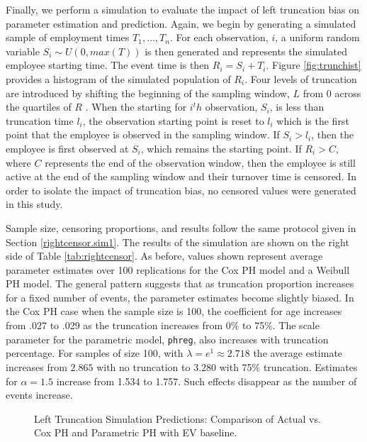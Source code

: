 \documentclass[12pt,letterpaper]{article}
\begin{document}
Finally, we perform a simulation to evaluate the impact of left truncation bias on parameter estimation and prediction. Again, we begin by generating a simulated sample of employment times $T_1, \ldots, T_n$.  For each observation, $i$, a uniform random variable $S_i \sim U(0,max(T))$ is then generated and represents the simulated employee starting time. The event time is then $R_i = S_i+T_i$. Figure \ref{fig:trunchist} provides a histogram of the simulated population of $R_i$. Four levels of truncation are introduced by shifting the beginning of the sampling window, $L$ from 0 across the quartiles of $R$ . When the starting for $i^th$ observation, $S_i$, is less than truncation time $l_i$, the observation starting point is reset to $l_i$ which is the first point that the employee is observed in the sampling window. If $S_i> l_i$, then the employee is first observed at $S_i$, which remains the starting point.  If $R_i>C$, where $C$ represents the end of the observation window, then the employee is still active at the end of the sampling window and their turnover time is censored. In order to isolate the impact of truncation bias, no censored values were generated in this study.


Sample size, censoring proportions, and results follow the same protocol given in Section \ref{rightcensor.sim1}.  The results of the simulation are shown on the right side of Table \ref{tab:rightcensor}.  As before, values shown represent average parameter estimates over 100 replications for the Cox PH model and a Weibull PH model. The general pattern suggests that as truncation proportion increases for a fixed number of events, the parameter estimates become slightly biased.  In the Cox PH case when the sample size is 100, the coefficient for age increases from .027 to .029 as the truncation increases from 0\% to 75\%. The scale parameter for the parametric model, {\tt phreg}, also increases with truncation percentage.  For samples of size 100, with $\lambda = e^1 \approx 2.718$ the average estimate increases from $2.865$ with no truncation to $3.280$ with 75\% truncation.  Estimates for $\alpha = 1.5$ increase from 1.534 to 1.757. Such effects disappear as the number of events increase.
 \begin{figure}[h!]
 	\centering
 	\quad
 	\quad
 	\quad
 	\caption{Left Truncation Simulation Predictions: Comparison of Actual vs. Cox PH and Parametric PH with EV baseline.}
 	\label{fig:leftbase}
 \end{figure}
\end{document}
